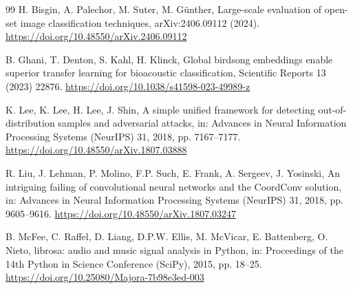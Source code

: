 \documentclass[review,3p,times]{elsarticle}
\begin{document}
\begin{thebibliography}{99}
H. Bisgin, A. Palechor, M. Suter, M. G\"unther, Large-scale evaluation of
open-set image classification techniques, arXiv:2406.09112 (2024).
\url{https://doi.org/10.48550/arXiv.2406.09112}

B. Ghani, T. Denton, S. Kahl, H. Klinck, Global birdsong embeddings enable
superior transfer learning for bioacoustic classification, Scientific Reports
13 (2023) 22876. \url{https://doi.org/10.1038/s41598-023-49989-z}

K. Lee, K. Lee, H. Lee, J. Shin, A simple unified framework for detecting
out-of-distribution samples and adversarial attacks, in: Advances in Neural
Information Processing Systems (NeurIPS) 31, 2018, pp. 7167--7177.
\url{https://doi.org/10.48550/arXiv.1807.03888}

R. Liu, J. Lehman, P. Molino, F.P. Such, E. Frank, A. Sergeev, J. Yosinski,
An intriguing failing of convolutional neural networks and the CoordConv
solution, in: Advances in Neural Information Processing Systems (NeurIPS) 31,
2018, pp. 9605--9616. \url{https://doi.org/10.48550/arXiv.1807.03247}

B. McFee, C. Raffel, D. Liang, D.P.W. Ellis, M. McVicar, E. Battenberg,
O. Nieto, librosa: audio and music signal analysis in Python, in: Proceedings
of the 14th Python in Science Conference (SciPy), 2015, pp. 18--25.
\url{https://doi.org/10.25080/Majora-7b98e3ed-003}

\end{thebibliography}
\end{document}
